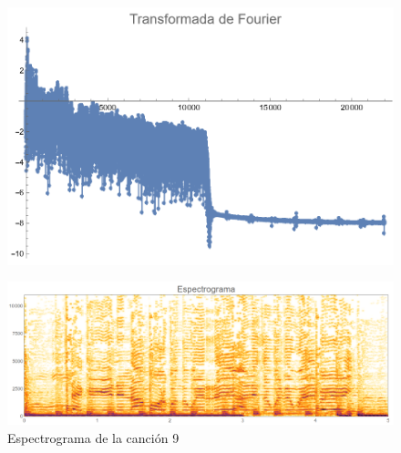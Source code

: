 \documentclass[12pt, letterpaper]{article}
\begin{document}
\begin{figure}[H]
  \centering
  \begin{minipage}{.4\linewidth}
    \centering
    \includegraphics[width=\linewidth]{imgs/Cancion9/transformada.png}
    \label{fig:09a}
  \end{minipage}
  \begin{minipage}{0.07\textwidth}\end{minipage}
  \begin{minipage}{.47\linewidth}
    \centering
    \includegraphics[width=\linewidth]{imgs/Cancion9/espectrograma.png}
    \caption{Espectrograma de la canción 9}
    \label{fig:09i}
  \end{minipage}
\end{figure}
\end{document}

